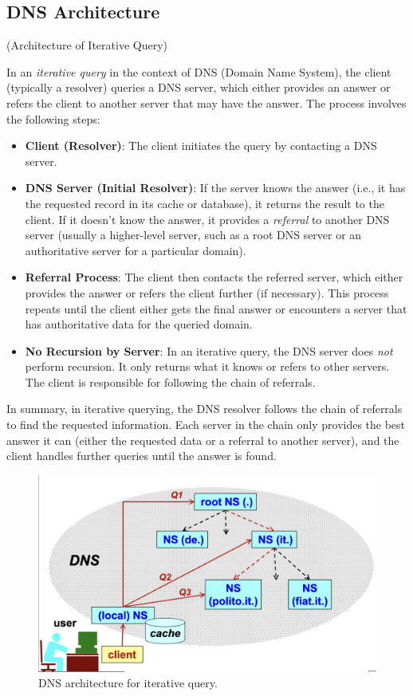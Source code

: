 \subsection{DNS Architecture}
\begin{center}
    (Architecture of Iterative Query)
\end{center}

In an \textit{iterative query} in the context of DNS (Domain Name System), the client (typically a resolver) queries a DNS server, which either provides an answer or refers the client to another server that may have the answer. The process involves the following steps:

\begin{itemize}
    \item \textbf{Client (Resolver)}: The client initiates the query by contacting a DNS server.
    \item \textbf{DNS Server (Initial Resolver)}: If the server knows the answer (i.e., it has the requested record in its cache or database), it returns the result to the client. If it doesn’t know the answer, it provides a \textit{referral} to another DNS server (usually a higher-level server, such as a root DNS server or an authoritative server for a particular domain).
    \item \textbf{Referral Process}: The client then contacts the referred server, which either provides the answer or refers the client further (if necessary). This process repeats until the client either gets the final answer or encounters a server that has authoritative data for the queried domain.
    \item \textbf{No Recursion by Server}: In an iterative query, the DNS server does \textit{not} perform recursion. It only returns what it knows or refers to other servers. The client is responsible for following the chain of referrals.
\end{itemize}

In summary, in iterative querying, the DNS resolver follows the chain of referrals to find the requested information. Each server in the chain only provides the best answer it can (either the requested data or a referral to another server), and the client handles further queries until the answer is found.

\begin{figure}[H]
  \includegraphics[width=\linewidth]{Images/NetSec/dns_architecture.png}
  \caption{DNS architecture for iterative query.}
\end{figure}

